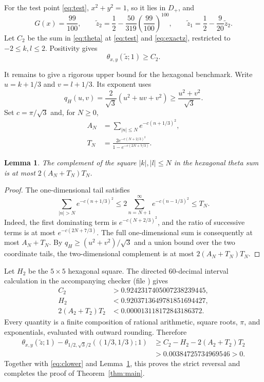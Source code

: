 \documentclass[11pt]{article}
\newtheorem{lemma}{Lemma}
\newcommand{\D}{D_+}
\newcommand{\tht}{\theta}
\begin{document}
For the test point \eqref{eq:test}, $x^2+y^2=1$, so it lies in $\D$, and
\begin{equation}\label{eq:exactz}
 G(x)=\frac{99}{100},\qquad
 \widetilde z_2=\frac12-\frac{50}{319}
       \left(\frac{99}{100}\right)^{100},\qquad
 \widetilde z_1=\frac12-\frac9{20}\widetilde z_2.
\end{equation}
Let $C_2$ be the sum in \eqref{eq:theta} at \eqref{eq:test} and
\eqref{eq:exactz}, restricted to $-2\leq k,l\leq2$.  Positivity gives
\begin{equation}\label{eq:clower}
 \tht_{x,y}(\widetilde z;1)\geq C_2.
\end{equation}

It remains to give a rigorous upper bound for the hexagonal benchmark.  Write
$u=k+1/3$ and $v=l+1/3$.  Its exponent uses
\[
 q_H(u,v)=\frac{2}{\sqrt3}(u^2+uv+v^2)
 \geq\frac{u^2+v^2}{\sqrt3}.
\]
Set $c=\pi/\sqrt3$ and, for $N\geq0$,
\begin{align*}
 A_N&=\sum_{|n|\leq N}e^{-c(n+1/3)^2},\\
 T_N&=\frac{2e^{-c(N+2/3)^2}}
 {1-e^{-c(2N+7/3)}}.
\end{align*}

\begin{lemma}\label{lem:tail}
The complement of the square $|k|,|l|\leq N$ in the hexagonal theta sum is
at most $2(A_N+T_N)T_N$.
\end{lemma}

\begin{proof}
The one-dimensional tail satisfies
\[
 \sum_{|n|>N}e^{-c(n+1/3)^2}
 \leq2\sum_{n=N+1}^{\infty}e^{-c(n-1/3)^2}\leq T_N.
\]
Indeed, the first dominating term is $e^{-c(N+2/3)^2}$, and the ratio of
successive terms is at most $e^{-c(2N+7/3)}$.  The full one-dimensional sum
is consequently at most $A_N+T_N$.  By $q_H\geq(u^2+v^2)/\sqrt3$ and a union
bound over the two coordinate tails, the two-dimensional complement is at
most $2(A_N+T_N)T_N$.
\end{proof}

Let $H_2$ be the $5\times5$ hexagonal square.  The directed 60-decimal
interval calculation in the accompanying checker (file
) gives
\begin{align*}
 C_2&>0.9242317405007238239445,\\
 H_2&<0.9203713649781851694427,\\
 2(A_2+T_2)T_2&<0.000013118172843186372.
\end{align*}
Every quantity is a finite composition of rational arithmetic, square roots,
$\pi$, and exponentials, evaluated with outward rounding.  Therefore
\begin{align*}
 \tht_{x,y}(\widetilde z;1)
 -\tht_{1/2,\sqrt3/2}((1/3,1/3);1)
 &\geq C_2-H_2-2(A_2+T_2)T_2\\
 &>0.00384725734969546>0.
\end{align*}
Together with \eqref{eq:clower} and Lemma~\ref{lem:tail}, this proves the
strict reversal and completes the proof of Theorem~\ref{thm:main}.
\end{document}
